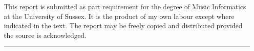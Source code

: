 \noindent
This report is submitted as part requirement for the degree of Music Informatics
at the University of Sussex. It is the product of my own labour except where
indicated in the text. The report may be freely copied and distributed
provided the source is acknowledged.\\[1cm]

\noindent
\rule{\linewidth}{0.2mm}
\pagebreak
